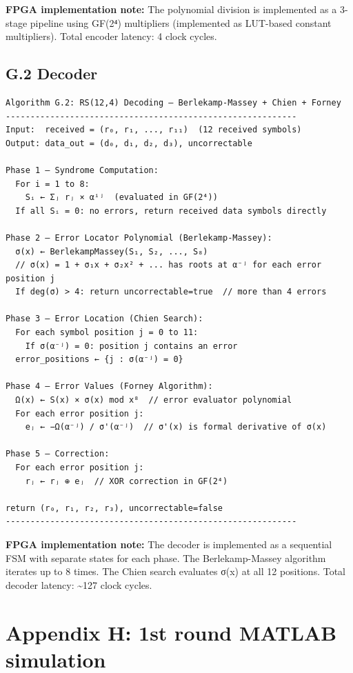 \documentclass[
  12pt,
  a4paper]{report}
\begin{document}
\textbf{FPGA implementation note:} The polynomial division is
implemented as a 3-stage pipeline using GF(2⁴) multipliers (implemented
as LUT-based constant multipliers). Total encoder latency: 4 clock
cycles.

\subsection{G.2 Decoder}\label{g.2-decoder}

\begin{verbatim}
Algorithm G.2: RS(12,4) Decoding — Berlekamp-Massey + Chien + Forney
-----------------------------------------------------------
Input:  received = (r₀, r₁, ..., r₁₁)  (12 received symbols)
Output: data_out = (d₀, d₁, d₂, d₃), uncorrectable

Phase 1 — Syndrome Computation:
  For i = 1 to 8:
    Sᵢ ← Σⱼ rⱼ × αⁱʲ  (evaluated in GF(2⁴))
  If all Sᵢ = 0: no errors, return received data symbols directly

Phase 2 — Error Locator Polynomial (Berlekamp-Massey):
  σ(x) ← BerlekampMassey(S₁, S₂, ..., S₈)
  // σ(x) = 1 + σ₁x + σ₂x² + ... has roots at α⁻ʲ for each error position j
  If deg(σ) > 4: return uncorrectable=true  // more than 4 errors

Phase 3 — Error Location (Chien Search):
  For each symbol position j = 0 to 11:
    If σ(α⁻ʲ) = 0: position j contains an error
  error_positions ← {j : σ(α⁻ʲ) = 0}

Phase 4 — Error Values (Forney Algorithm):
  Ω(x) ← S(x) × σ(x) mod x⁸  // error evaluator polynomial
  For each error position j:
    eⱼ ← −Ω(α⁻ʲ) / σ'(α⁻ʲ)  // σ'(x) is formal derivative of σ(x)

Phase 5 — Correction:
  For each error position j:
    rⱼ ← rⱼ ⊕ eⱼ  // XOR correction in GF(2⁴)

return (r₀, r₁, r₂, r₃), uncorrectable=false
-----------------------------------------------------------
\end{verbatim}

\textbf{FPGA implementation note:} The decoder is implemented as a
sequential FSM with separate states for each phase. The Berlekamp-Massey
algorithm iterates up to 8 times. The Chien search evaluates σ(x) at all
12 positions. Total decoder latency: \textasciitilde127 clock cycles.

\section{Appendix H: 1st round MATLAB
simulation}\label{appendix-h-1st-round-matlab-simulation}
\end{document}
